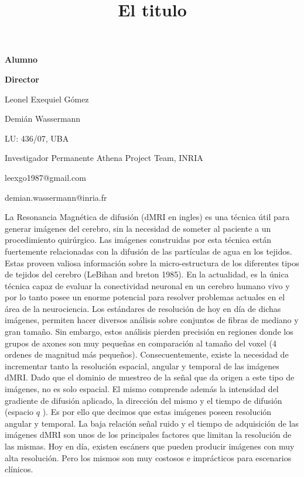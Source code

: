 \documentclass[a4paper,10pt]{article}
\title{El titulo}
\newcommand\textline[3][t]{%
  \par\smallskip\noindent\parbox[#1]{.333\textwidth}
  {\raggedright#3}%
  \parbox[#1]{.658\textwidth}{\raggedleft#2}%
}
\begin{document}
{
\textline[t]{\textbf{Director}}{\textbf{Alumno}}
\textline[t]{Demián Wassermann}{Leonel Exequiel G\'omez}
\textline[t]{Investigador Permanente Athena Project Team, INRIA}{LU: 436/07, UBA}
\textline[t]{demian.wassermann@inria.fr}{leexgo1987@gmail.com}
}





\vspace{2cm}


La Resonancia Magnética de difusión (dMRI en ingles) es una técnica útil para generar imágenes del 
cerebro, sin la necesidad de someter al paciente a un procedimiento quirúrgico. Las imágenes 
construidas por esta técnica están fuertemente relacionadas con la difusión de las partículas de agua en los tejidos. 
Estas proveen valiosa información sobre la micro-estructura de los diferentes tipos de tejidos del cerebro 
(LeBihan and breton 1985). En la actualidad, es la única técnica capaz de evaluar 
la conectividad neuronal en un cerebro humano vivo y por lo tanto posee un enorme potencial para resolver problemas 
actuales en el área de la neurociencia. Los estándares de resolución de hoy en día de dichas imágenes, permiten hacer 
diversos análisis sobre conjuntos de fibras de mediano y gran tamaño. Sin embargo, estos análisis 
pierden precisión en regiones donde los grupos de axones son muy pequeñas en comparación al tamaño del voxel (4 ordenes 
de magnitud más pequeños). Consecuentemente, existe la necesidad de incrementar tanto la resolución 
espacial, angular y temporal de 
las imágenes dMRI. Dado que el dominio de muestreo de la señal que da origen a este tipo de imágenes, no es solo 
espacial. El mismo comprende además la intensidad del gradiente de difusión aplicado, la dirección del mismo y el 
tiempo de difusión (espacio $q$ \citep{CALLAGHAN1990177}). Es por ello que decimos que estas imágenes poseen resolución 
angular y temporal. La baja relaci\'on se\~nal ruido y el tiempo de adquisici\'on de las imágenes dMRI son unos de los 
principales factores que limitan la resolución de las mismas. %
Hoy en día, existen escáners que pueden 
producir imágenes con muy alta resolución. Pero los mismos son muy costosos e 
imprácticos para escenarios clínicos.
\end{document}
